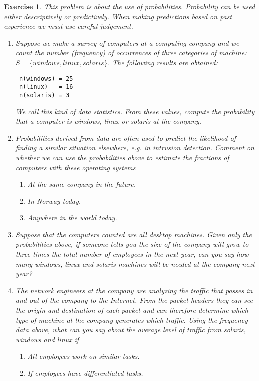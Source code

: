 \documentclass{book}
\newtheorem{exercise}{Exercise}
\begin{document}
\begin{exercise} 
This problem is about the use of probabilities. Probability can be used
either descriptively or predictively. When making predictions based on
past experience we must use careful judgement.
\begin{enumerate}
\item Suppose we make a survey of computers at a computing company and we count the
number (frequency) of occurrences of three categories of machine:
$S = \{ windows, linux, solaris\}$. The following results are obtained:
\begin{verbatim}
 n(windows) = 25
 n(linux)   = 16
 n(solaris) = 3
\end{verbatim}
We call this kind of data {\em statistics}. From these values, compute the
probability that a computer is windows, linux or solaris at the company.
\item Probabilities derived from data are often used to predict the likelihood
of finding a similar situation elsewhere, e.g. in intrusion detection.
Comment on whether we can use the probabilities above to estimate the
fractions of computers with these operating systems
\begin{enumerate}
\item At the same company in the future.
\item In Norway today.
\item Anywhere in the world today.
\end{enumerate}

\item Suppose that the computers counted are all desktop machines.
Given only the probabilities above, if someone tells you the size of the
company will grow to three times the total number of employees in the next year,
can you say how many windows, linux and solaris machines will be needed at the
company next year?

\item The network engineers at the company are analyzing the traffic that
passes in and out of the company to the Internet. From the packet headers they
can see the origin and destination of each packet and can therefore determine
which type of machine at the company generates which traffic. 
Using the frequency data above, what can you
say about the average level of traffic from solaris, windows and linux if
\begin{enumerate}
\item All employees work on similar tasks.
\item If employees have differentiated tasks.
\end{enumerate}

\end{enumerate}

\end{exercise}
\begin{solution}
\end{solution}
\end{document}
